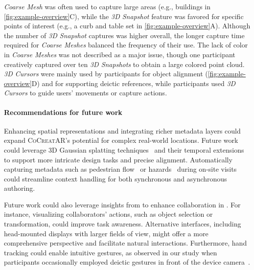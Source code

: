 \textit{Coarse Mesh} was often used to capture large areas (e.g., buildings in \cref{fig:example-overview}C), while the \textit{3D Snapshot} feature was favored for specific points of interest (e.g., a curb and table set in \cref{fig:example-overview}A). Although the number of \textit{3D Snapshot} captures was higher overall, the longer capture time required for \textit{Coarse Meshes} balanced the frequency of their use. The lack of color in \textit{Coarse Meshes} was not described as a major issue, though one participant creatively captured over ten \textit{3D Snapshots} to obtain a large colored point cloud. \textit{3D Cursors} were mainly used by \insitu participants for object alignment (\cref{fig:example-overview}D) and for supporting deictic references, while \exsitu participants used \textit{3D Cursors} to guide \insitu users' movements or capture actions.

\paragraph{\textbf{Recommendations for future work}}
Enhancing spatial representations and integrating richer metadata layers could expand \textsc{CoCreatAR}'s potential for complex real-world locations. Future work could leverage 3D Gaussian splatting techniques~\cite{kerbl3DGaussianSplatting2023} and their temporal extensions~\cite{wu4DGaussianSplatting2024,mihajlovicSplatFieldsNeuralGaussian2024} to support more intricate design tasks and precise alignment. Automatically capturing metadata such as pedestrian flow~\cite{sindagiGeneratingHighQualityCrowd2017} or hazards~\cite{suRASSARRoomAccessibility2024} during on-site visits could streamline context handling for both synchronous and asynchronous \exsitu authoring.

Future work could also leverage insights from \citet{fussellCoordinationCommunicationEffects2000} to enhance collaboration in \SystemName. For instance, visualizing collaborators' actions, such as object selection or transformation, could improve task awareness. Alternative \insitu interfaces, including head-mounted displays with larger fields of view, might offer a more comprehensive perspective and facilitate natural interactions. Furthermore, hand tracking could enable intuitive gestures, as observed in our study when participants occasionally employed deictic gestures in front of the device camera~\cite{kimWorldPointFingerPointing2023,fussellGesturesVideoStreams2004}.

